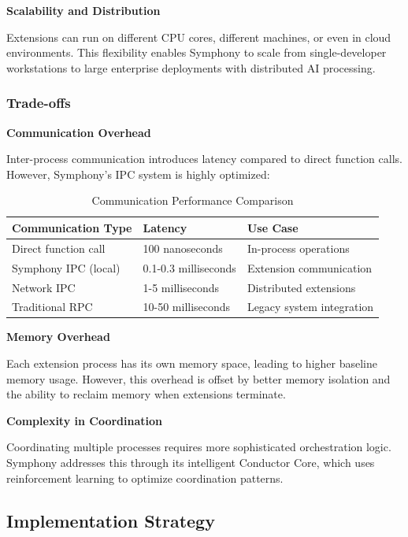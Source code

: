 \textbf{Scalability and Distribution}

Extensions can run on different CPU cores, different machines, or even in cloud environments. This flexibility enables Symphony to scale from single-developer workstations to large enterprise deployments with distributed AI processing.

\subsubsection{Trade-offs}

\textbf{Communication Overhead}

Inter-process communication introduces latency compared to direct function calls. However, Symphony's IPC system is highly optimized:

\begin{table}[h]
\centering
\caption{Communication Performance Comparison}
\label{tab:communication-performance}
\begin{tabular}{@{}lll@{}}
\toprule
\textbf{Communication Type} & \textbf{Latency} & \textbf{Use Case} \\
\midrule
Direct function call & 100 nanoseconds & In-process operations \\
Symphony IPC (local) & 0.1-0.3 milliseconds & Extension communication \\
Network IPC & 1-5 milliseconds & Distributed extensions \\
Traditional RPC & 10-50 milliseconds & Legacy system integration \\
\bottomrule
\end{tabular}
\end{table}

\textbf{Memory Overhead}

Each extension process has its own memory space, leading to higher baseline memory usage. However, this overhead is offset by better memory isolation and the ability to reclaim memory when extensions terminate.

\textbf{Complexity in Coordination}

Coordinating multiple processes requires more sophisticated orchestration logic. Symphony addresses this through its intelligent Conductor Core, which uses reinforcement learning to optimize coordination patterns.

\subsection{Implementation Strategy}
\label{subsec:implementation-strategy}

